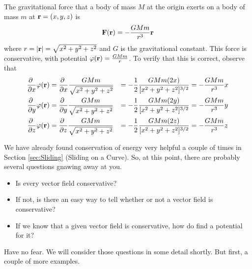 \begin{eg}[Gravity]\label{eg:gravity}
The gravitational force that a body of mass $M$ at the origin
exerts on a body of mass $m$ at $\mathbf{r}=(x,y,z)$ is
\begin{equation*}
\mathbf{F}(\mathbf{r}) = -\frac{GMm}{r^3}\mathbf{r}
\end{equation*}
where $r=|\mathbf{r}|=\sqrt{x^2+y^2+z^2}$ and $G$ is the gravitational constant.
This force is conservative, with potential $\varphi(\mathbf{r}) = \frac{GMm}{r}$. 
To verify that this is correct, observe that
\begin{alignat*}{3}
\frac{\partial\ }{\partial x}\varphi(\mathbf{r})
   &=\frac{\partial\ }{\partial x}\frac{GMm}{\sqrt{x^2+y^2+z^2}}
   &=-\frac{1}{2}\frac{GMm(2x)}{[x^2+y^2+z^2]^{3/2}} 
   &=-\frac{GMm}{r^3}x \\ 
\frac{\partial\ }{\partial y}\varphi(\mathbf{r})
   &=\frac{\partial\ }{\partial y}\frac{GMm}{\sqrt{x^2+y^2+z^2}}
   &=-\frac{1}{2}\frac{GMm(2y)}{[x^2+y^2+z^2]^{3/2}} 
   &=-\frac{GMm}{r^3}y \\ 
\frac{\partial\ }{\partial z}\varphi(\mathbf{r})
   &=\frac{\partial\ }{\partial z}\frac{GMm}{\sqrt{x^2+y^2+z^2}}
   &=-\frac{1}{2}\frac{GMm(2z)}{[x^2+y^2+z^2]^{3/2}} 
   &=-\frac{GMm}{r^3}z  
\end{alignat*}
\end{eg}

We have already found conservation of energy very helpful 
a couple of times in Section \ref{sec:Sliding} (Sliding on a Curve).
So, at this point, there are probably several questions gnawing away at you.
\begin{itemize}
\item
Is every vector field conservative?

\item
If not, is there an easy way to tell whether or not a vector field 
is conservative?

\item
If we know that a given vector field is conservative, how do find a potential
for it?

\end{itemize}
Have no fear. We will consider those questions in some detail shortly.
But first, a couple of more examples. 



